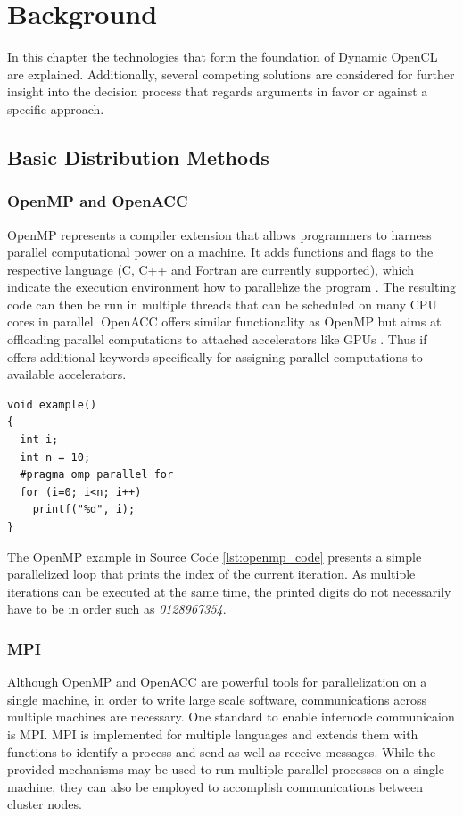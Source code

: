 \chapter{Background}
\label{background}
In this chapter the technologies that form the foundation of Dynamic OpenCL are explained. Additionally, several competing solutions are considered for further insight into the decision process that regards arguments in favor or against a specific approach.

\section{Basic Distribution Methods}
\label{distribution_basics}

\subsection*{OpenMP and OpenACC}
OpenMP represents a compiler extension that allows programmers to harness parallel computational power on a machine. It adds functions and flags to the respective language (C, C++ and Fortran are currently supported), which indicate the execution environment how to parallelize the program \cite{openmp_spec}. The resulting code can then be run in multiple threads that can be scheduled on many CPU cores in parallel. OpenACC offers similar functionality as OpenMP but aims at offloading parallel computations to attached accelerators like GPUs \cite{openacc_spec}. Thus if offers additional keywords specifically for assigning parallel computations to available accelerators.

\begin{lstlisting}[caption=OpenMP Code Example in C,captionpos=b,label=lst:openmp_code]
void example()
{
  int i;
  int n = 10;
  #pragma omp parallel for
  for (i=0; i<n; i++)
    printf("%d", i);
}
\end{lstlisting}

The OpenMP example in Source Code \ref{lst:openmp_code} presents a simple parallelized loop that prints the index of the current iteration. As multiple iterations can be executed at the same time, the printed digits do not necessarily have to be in order such as \textit{0128967354}.

\subsection*{MPI}
Although OpenMP and OpenACC are powerful tools for parallelization on a single machine, in order to write large scale software, communications across multiple machines are necessary. One standard to enable internode communicaion is MPI. MPI is implemented for multiple languages and extends them with functions to identify a process and send as well as receive messages\cite{mpi_spec}. While the provided mechanisms may be used to run multiple parallel processes on a single machine, they can also be employed to accomplish communications between cluster nodes.

